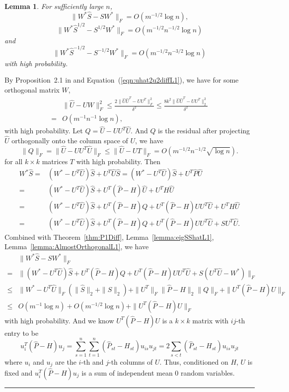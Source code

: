 \documentclass[a4paper]{article}
\newenvironment{proof}{{\bf Proof:  }}{\hfill\rule{2mm}{2mm}}
\newtheorem{lemma}[fact]{Lemma}
\renewcommand{\hat}{\widehat}
\begin{document}
\begin{lemma}
\label{lemma:exchangeL1}
For sufficiently large $n$,
\[
	\| W^* \hat{S} - S W^* \|_F = O(m^{-1/2} \log n),
\]
\[
	\|W^* \hat{S}^{1/2} - S^{1/2} W^* \|_F = O(m^{-1/2} n^{-1/2} \log n)
\]
and
\[
	\| W^* \hat{S}^{-1/2} - S^{-1/2} W^* \|_F = O(m^{-1/2} n^{-3/2} \log n)
\]
with high probability.
\end{lemma}
\begin{proof}
By Proposition~2.1 in \citep{rohe2011spectral} and Equation~(\ref{eqn:uhat2u2diffL1}), we have for some orthogonal matrix $W$, 
\begin{align*}
& \|\hat{U} - U W\|_F^2 \le \frac{2 \|\hat{U} \hat{U}^T - U U^T\|_F^2}{\delta^2}
\le \frac{8 k^2 \|\hat{U} \hat{U}^T - U U^T\|_2^2}{\delta^2} \\
= & O(m^{-1} n^{-1} \log n),
\end{align*}
with high probability.
Let $Q = \hat{U} - U U^T \hat{U}$. And $Q$ is the residual after projecting $\hat{U}$ orthogonally onto the column space of $U$, we have
\begin{equation}
\label{eqn:QFnormL1}
\| Q \|_F = \| \hat{U} - U U^T \hat{U} \|_F \le \| \hat{U} - U T \|_F = O(m^{-1/2} n^{-1/2} \sqrt{\log n}).
\end{equation}
for all $k \times k$ matrices $T$ with high probability. 
Then
\begin{align*}
	W^* \hat{S} = & (W^* - U^T \hat{U}) \hat{S} + U^T \hat{U} \hat{S}
    = (W^* - U^T \hat{U}) \hat{S} + U^T \hat{P} \hat{U} \\
    = & (W^* - U^T \hat{U}) \hat{S} + U^T (\hat{P} - H) \hat{U} + U^T H \hat{U} \\
    = & (W^* - U^T \hat{U}) \hat{S} + U^T (\hat{P} - H) Q + U^T (\hat{P} - H) U U^T \hat{U} + U^T H \hat{U} \\
    = & (W^* - U^T \hat{U}) \hat{S} + U^T (\hat{P} - H) Q + U^T (\hat{P} - H) U U^T \hat{U} + S U^T \hat{U}.
\end{align*}
Combined with Theorem~\ref{thm:P1Diff}, Lemma~\ref{lemma:eigSShatL1}, Lemma~\ref{lemma:AlmostOrthogonalL1}, we have
\begin{align*}
	& \| W^* \hat{S} - S W^* \|_F \\
    = & \| (W^* - U^T \hat{U}) \hat{S} + U^T (\hat{P} - H) Q + U^T (\hat{P} - H) U U^T \hat{U} + S (U^T \hat{U} - W^*)\|_F \\
    \le & \| W^* - U^T \hat{U} \|_F (\| \hat{S} \|_2 + \| S \|_2) + \| U^T \|_F \| \hat{P} - H\|_2 \| Q \|_F + \| U^T (\hat{P} - H) U \|_F \\
    \le & O(m^{-1} \log n) + O(m^{-1/2} \log n) + \| U^T (\hat{P} - H) U \|_F
\end{align*}
with high probability. And we know $U^T (\hat{P} - H) U$ is a $k \times k$ matrix with $ij$-th entry to be
\[
	u_i^T (\hat{P} - H) u_j
    = \sum_{s=1}^n \sum_{t=1}^n (\hat{P}_{st} - H_{st}) u_{is} u_{jt}
    = 2 \sum_{s<t} (\hat{P}_{st} - H_{st}) u_{is} u_{jt}
\]
where $u_i$ and $u_j$ are the $i$-th and $j$-th columns of $U$. Thus, conditioned on $H$, $U$ is fixed and $u_i^T (\hat{P} - H) u_j$ is a sum of independent mean 0 random variables.



\end{proof}
\end{document}

